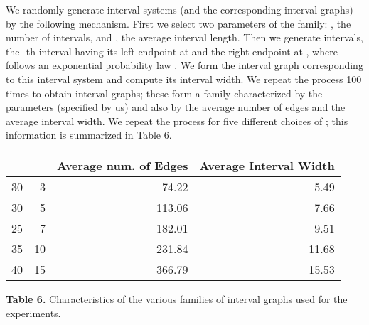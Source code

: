 \documentclass[11pt]{article}\usepackage{amsmath}
\begin{document}
We randomly generate interval systems (and the corresponding interval graphs)
by the following mechanism. First we select two parameters of the family: ,
the number of intervals, and , the average interval length. Then we
generate  intervals, the -th interval having its left endpoint at 
and the right endpoint at , where  follows an exponential
probability law . We form the
interval graph  corresponding to this interval system and compute
its interval width. We repeat the process 100 times to obtain  interval
graphs; these form a family characterized by the parameters 
(specified by us) and also by the average number of edges and the average
interval width. We repeat the process for five different choices of ; this information is summarized in Table 6.

\begin{center}\begin{tabular}
[c]{|l|l|c|c|}\hline
 &  & \textbf{Average num. of Edges} & \textbf{Average Interval
Width}\\\hline
\multicolumn{1}{|r|}{30} & \multicolumn{1}{|r|}{3} &
\multicolumn{1}{|r|}{74.22} & \multicolumn{1}{|r|}{5.49}\\\hline
\multicolumn{1}{|r|}{30} & \multicolumn{1}{|r|}{5} &
\multicolumn{1}{|r|}{113.06} & \multicolumn{1}{|r|}{7.66}\\\hline
\multicolumn{1}{|r|}{25} & \multicolumn{1}{|r|}{7} &
\multicolumn{1}{|r|}{182.01} & \multicolumn{1}{|r|}{9.51}\\\hline
\multicolumn{1}{|r|}{35} & \multicolumn{1}{|r|}{10} &
\multicolumn{1}{|r|}{231.84} & \multicolumn{1}{|r|}{11.68}\\\hline
\multicolumn{1}{|r|}{40} & \multicolumn{1}{|r|}{15} &
\multicolumn{1}{|r|}{366.79} & \multicolumn{1}{|r|}{15.53}\\\hline
\end{tabular}


\textbf{Table 6.} Characteristics of the various families of interval graphs
used for the experiments.
\end{center}

\bigskip
\end{document}
